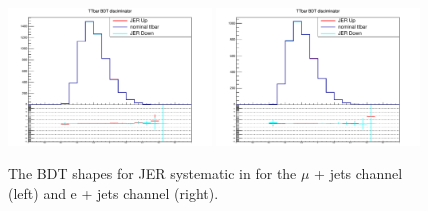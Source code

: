 


\begin{figure}[ht!]
    \includegraphics[width=0.48\textwidth]{images/Run2/Sys/JERsystt.pdf}
    \includegraphics[width=0.48\textwidth]{images/Run2/Sys/JERsystt_e.pdf}     
    \caption{The BDT shapes for JER systematic in \ttbar for the $\mu$ + jets channel (left) and e + jets channel (right).}
    \label{fig:SysShapesJERtt}
\end{figure}

